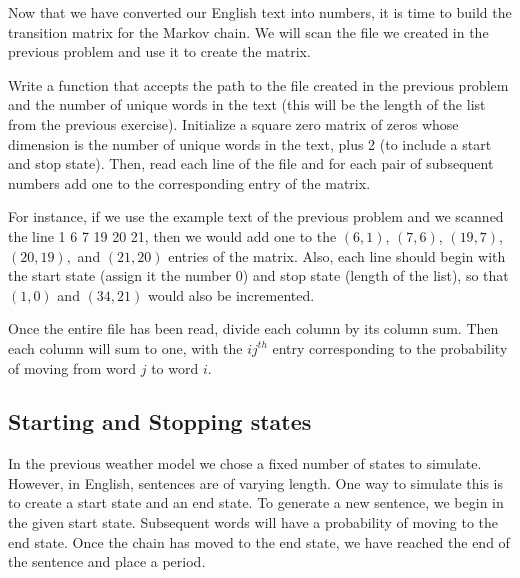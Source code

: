 Now that we have converted our English text into numbers, it is time to build the transition matrix for the Markov chain.
We will scan the file we created in the previous problem and use it to create the matrix.

\begin{problem}
Write a function that accepts the path to the file created in the previous problem and the number of unique words in the text (this will be the length of the list from the previous exercise).
Initialize a square zero matrix of zeros whose dimension is the number of unique words in the text, plus 2 (to include a start and stop state).
Then, read each line of the file and for each pair of subsequent numbers add one to the corresponding entry of the matrix.

For instance, if we use the example text of the previous problem and we scanned the line 1 6 7 19 20 21, then we would add one to the $(6,1)$, $(7,6)$, $(19,7)$, $(20,19),$ and $(21,20)$ entries of the matrix.
Also, each line should begin with the start state (assign it the number 0) and stop state (length of the list), so that $(1,0)$ and $(34,21)$ would also be incremented.

Once the entire file has been read, divide each column by its column sum.
Then each column will sum to one, with the $ij^{th}$ entry corresponding to the probability of moving from word $j$ to word $i$.
\label{problem:chainmaker}
\end{problem}

\subsection*{Starting and Stopping states}

In the previous weather model we chose a fixed number of states to simulate.
However, in English, sentences are of varying length.
One way to simulate this is to create a start state and an end state.
To generate a new sentence, we begin in the given start state.
Subsequent words will have a probability of moving to the end state.
Once the chain has moved to the end state, we have reached the end of the sentence and place a period.


